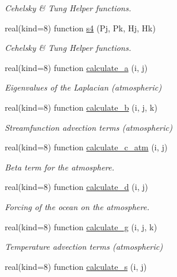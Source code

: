 \begin{DoxyCompactItemize}
\begin{DoxyCompactList}\small\item\em Cehelsky \& Tung Helper functions. \end{DoxyCompactList}\item 
real(kind=8) function \hyperlink{namespaceinprod__analytic_a8dacf930ffdf8fd09da0a77bfd4d3a4b}{s4} (Pj, Pk, Hj, Hk)
\begin{DoxyCompactList}\small\item\em Cehelsky \& Tung Helper functions. \end{DoxyCompactList}\item 
real(kind=8) function \hyperlink{namespaceinprod__analytic_afc3e503e1fd9774693f02e0fe87ec63a}{calculate\+\_\+a} (i, j)
\begin{DoxyCompactList}\small\item\em Eigenvalues of the Laplacian (atmospheric) \end{DoxyCompactList}\item 
real(kind=8) function \hyperlink{namespaceinprod__analytic_a63625452db6424cf46aa93bb9ce3e2f2}{calculate\+\_\+b} (i, j, k)
\begin{DoxyCompactList}\small\item\em Streamfunction advection terms (atmospheric) \end{DoxyCompactList}\item 
real(kind=8) function \hyperlink{namespaceinprod__analytic_aa242adb49ed57168cfd281c90ddd6490}{calculate\+\_\+c\+\_\+atm} (i, j)
\begin{DoxyCompactList}\small\item\em Beta term for the atmosphere. \end{DoxyCompactList}\item 
real(kind=8) function \hyperlink{namespaceinprod__analytic_a519a70cc6ad55be09a56df9753e43e61}{calculate\+\_\+d} (i, j)
\begin{DoxyCompactList}\small\item\em Forcing of the ocean on the atmosphere. \end{DoxyCompactList}\item 
real(kind=8) function \hyperlink{namespaceinprod__analytic_afa66e718a91ec595e483cb20befce6a6}{calculate\+\_\+g} (i, j, k)
\begin{DoxyCompactList}\small\item\em Temperature advection terms (atmospheric) \end{DoxyCompactList}\item 
real(kind=8) function \hyperlink{namespaceinprod__analytic_a5cdb72e3766b95108cef81b2cff503f9}{calculate\+\_\+s} (i, j)

\end{DoxyCompactItemize}
